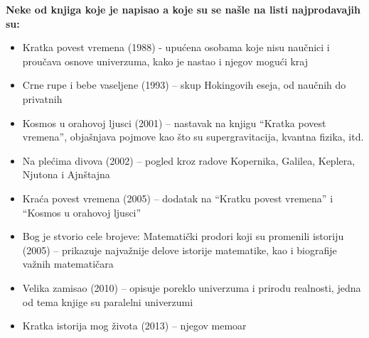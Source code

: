 \documentclass[a4paper, 12pt]{article}
\begin{document}
{\vspace{1cm}
\textbf{Neke od knjiga koje je napisao a koje su se našle na listi najprodavajih su:} 
\begin{itemize}
 \item Kratka povest vremena (1988) - upućena osobama koje nisu naučnici i proučava osnove univerzuma, kako je nastao i njegov mogući kraj
 \item Crne rupe i bebe vaseljene (1993) – skup Hokingovih eseja, od naučnih do privatnih
 \item Kosmos u orahovoj ljusci (2001) – nastavak na knjigu “Kratka povest vremena”, objašnjava pojmove kao što su supergravitacija, kvantna fizika, itd.
 \item Na plećima divova (2002) – pogled kroz radove Kopernika, Galilea, Keplera, Njutona i Ajnštajna
 \item Kraća povest vremena (2005) – dodatak na “Kratku povest vremena” i “Kosmos u orahovoj ljusci”
 \item Bog je stvorio cele brojeve: Matematički prodori koji su promenili istoriju (2005) –  prikazuje najvažnije delove istorije matematike, kao i biografije važnih matematičara
 \item Velika zamisao (2010) – opisuje poreklo univerzuma i prirodu realnosti, jedna od tema knjige su paralelni univerzumi
 \item Kratka istorija mog života (2013) – njegov memoar
\end{itemize}
\cite{bestbooks}

}
\end{document}
